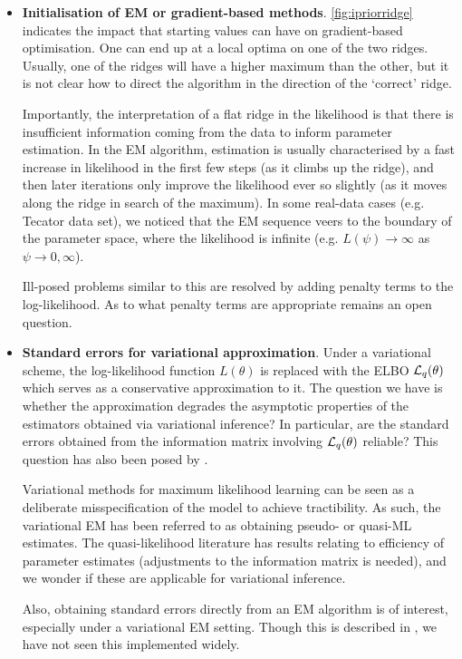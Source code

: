 \documentclass[showframe,11pt,twoside,openright]{report}
\begin{document}
\begin{itemize}
  \item \textbf{Initialisation of EM or gradient-based methods}.
  \cref{fig:ipriorridge} indicates the impact that starting values can have on gradient-based optimisation.
  One can end up at a local optima on one of the two ridges.
  Usually, one of the ridges will have a higher maximum than the other, but it is not clear how to direct the algorithm in the direction of the `correct' ridge.
  
  Importantly, the interpretation of a flat ridge in the likelihood is that there is insufficient information coming  from the data to inform parameter estimation.
  In the EM algorithm, estimation is usually characterised by a fast increase in likelihood in the first few steps (as it climbs up the ridge), and then later iterations only improve the likelihood ever so slightly (as it moves along the ridge in search of the maximum).
  In some real-data cases (e.g. Tecator data set), we noticed that the EM sequence veers to the boundary of the parameter space, where the likelihood is infinite (e.g. $L(\psi) \to \infty$ as $\psi\to 0,\infty$).
  
  Ill-posed problems similar to this are resolved by adding penalty terms to the log-likelihood.
  As to what penalty terms are appropriate remains an open question.
  
  \item \textbf{Standard errors for variational approximation}. 
  Under a variational scheme, the log-likelihood function $L(\theta)$ is replaced with the ELBO ${\mathcal L}_q(\theta)$ which serves as a  conservative approximation to it. 
  The question we have is whether the approximation degrades the asymptotic properties of the estimators obtained via variational inference?
  In particular, are the standard errors obtained from the information matrix involving ${\mathcal L}_q(\theta)$ reliable?
  This question has also been posed by \citet{hall2011asymptotic,bickel2013asymptotic,chen2017use}.
  
  Variational methods for maximum likelihood learning can be seen as a deliberate misspecification of the model to achieve tractibility. 
  As such, the variational EM has been referred to as obtaining pseudo- or quasi-ML estimates.
  The quasi-likelihood literature has results relating to efficiency of parameter estimates (adjustments to the information matrix is needed), and we wonder if these are applicable for variational inference.
  
  Also, obtaining standard errors directly from an EM algorithm is of interest, especially under a variational EM setting.
  Though this is described in \citet[Ch. 4]{mclachlan2007algorithm}, we have not seen this implemented widely.
  

\end{itemize}
\end{document}
